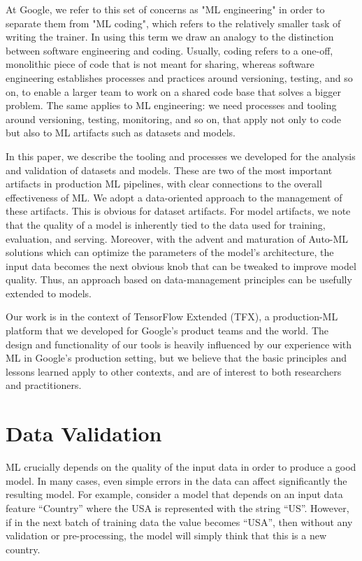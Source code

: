 \documentclass[11pt]{article}
\begin{document}
At Google, we refer to this set of concerns as "ML engineering" in order to separate them from "ML coding", which refers to the relatively smaller task of writing the trainer. In using this term we draw an analogy to the distinction between software engineering and coding. Usually, coding refers to a one-off, monolithic piece of code that is not meant for sharing, whereas software engineering establishes processes and practices around versioning, testing, and so on, to enable a larger team to work on a shared code base that solves a bigger problem. The same applies to ML engineering: we need processes and tooling around versioning, testing,  monitoring, and so on, that apply not only to code but also to ML artifacts such as datasets and models. 

In this paper, we describe the tooling and processes we developed for the analysis and validation of datasets and models. These are two of the most important artifacts in production ML pipelines, with clear connections to the overall effectiveness of ML. We adopt a data-oriented approach to the management of these artifacts. This is obvious for dataset artifacts. For model artifacts, we note that the quality of a model is inherently tied to the data used for training, evaluation, and serving. Moreover, with the advent and maturation of Auto-ML solutions which can optimize the parameters of the model's architecture, the input data becomes the next obvious knob that can be tweaked to improve model quality. Thus, an approach based on data-management principles can be usefully extended to models.

Our work is in the context of TensorFlow Extended (TFX), a production-ML platform that we developed for Google's product teams and the world. The design and functionality of our tools is heavily influenced by our experience with ML in Google's production setting, but we believe that the basic principles and lessons learned apply to other contexts, and are of interest to both researchers and practitioners. 

\section{Data Validation}
ML crucially depends on the quality of the input data in order to produce a good model. In many cases, even simple errors in the data can affect significantly the resulting model. For example, consider a model that depends on an input data feature ``Country'' where the USA is represented with the string ``US''. However, if in the next batch of training data the value becomes ``USA'', then without any validation or pre-processing, the model will simply think that this is a new country.
\end{document}
